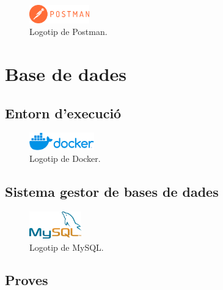 \documentclass[a4paper,12pt]{ThesisStyle}
\begin{document}
\begin{figure}[H]
  \centering
  \includegraphics[width=0.23\textwidth]{assets/logos/Postman.png}
  \caption{\label{img:logo_postman}Logotip de Postman.}
\end{figure}

\section{Base de dades}
\label{sec:decisions_bdd}




\subsection{Entorn d'execució}
\label{subsec:decisions_bdd_entorn}


\begin{figure}[H]
  \centering
  \includegraphics[width=0.25\textwidth]{assets/logos/Docker.png}
  \caption{\label{img:logo_docker}Logotip de Docker.}
\end{figure}

\subsection{Sistema gestor de bases de dades}
\label{subsec:decisions_bdd_sgbd}



\begin{figure}[H]
  \centering
  \includegraphics[width=0.2\textwidth]{assets/logos/MySQL.png}
  \caption{\label{img:logo_mysql}Logotip de MySQL.}
\end{figure}

\subsection{Proves}
\label{subsec:decisions_bdd_proves}
\end{document}
